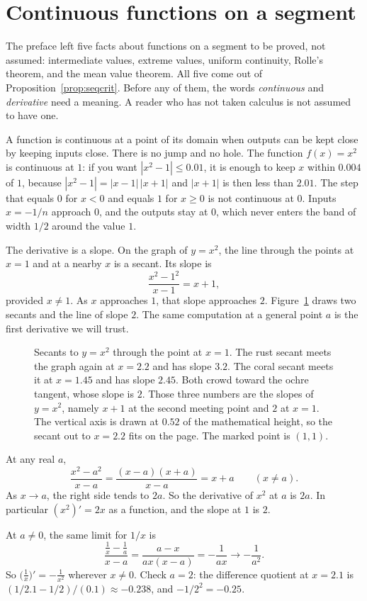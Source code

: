 \section{Continuous functions on a segment}

The preface left five facts about functions on a segment to be proved, not assumed: intermediate values, extreme values, uniform continuity, Rolle's theorem, and the mean value theorem. All five come out of Proposition~\ref{prop:seqcrit}. Before any of them, the words \emph{continuous} and \emph{derivative} need a meaning. A reader who has not taken calculus is not assumed to have one.

A function is continuous at a point of its domain when outputs can be kept close by keeping inputs close. There is no jump and no hole. The function $f(x)=x^2$ is continuous at $1$: if you want $|x^2-1|\le 0.01$, it is enough to keep $x$ within $0.004$ of $1$, because $|x^2-1|=|x-1|\,|x+1|$ and $|x+1|$ is then less than $2.01$. The step that equals $0$ for $x<0$ and equals $1$ for $x\ge 0$ is not continuous at $0$. Inputs $x=-1/n$ approach $0$, and the outputs stay at $0$, which never enters the band of width $1/2$ around the value $1$.

The derivative is a slope. On the graph of $y=x^2$, the line through the points at $x=1$ and at a nearby $x$ is a secant. Its slope is
\[
\frac{x^2-1^2}{x-1}=x+1,
\]
provided $x\ne 1$. As $x$ approaches $1$, that slope approaches $2$. Figure~\ref{fig:secant} draws two secants and the line of slope $2$. The same computation at a general point $a$ is the first derivative we will trust.

\begin{figure}[ht]
\centering
{}
\caption{Secants to $y=x^2$ through the point at $x=1$. The rust secant meets the graph again at $x=2.2$ and has slope $3.2$. The coral secant meets it at $x=1.45$ and has slope $2.45$. Both crowd toward the ochre tangent, whose slope is $2$. Those three numbers are the slopes of $y=x^2$, namely $x+1$ at the second meeting point and $2$ at $x=1$. The vertical axis is drawn at $0.52$ of the mathematical height, so the secant out to $x=2.2$ fits on the page. The marked point is $(1,1)$.}
\label{fig:secant}
\end{figure}

\begin{examplex}
At any real $a$,
\[
\frac{x^2-a^2}{x-a}=\frac{(x-a)(x+a)}{x-a}=x+a\qquad(x\ne a).
\]
As $x\to a$, the right side tends to $2a$. So the derivative of $x^2$ at $a$ is $2a$. In particular $(x^2)'=2x$ as a function, and the slope at $1$ is $2$.

At $a\ne 0$, the same limit for $1/x$ is
\[
\frac{\frac1x-\frac1a}{x-a}=\frac{a-x}{ax(x-a)}=-\frac1{ax}\longrightarrow-\frac1{a^2}.
\]
So $\bigl(\frac1x\bigr)'=-\frac1{x^2}$ wherever $x\ne 0$. Check $a=2$: the difference quotient at $x=2.1$ is $(1/2.1-1/2)/(0.1)\approx -0.238$, and $-1/2^2=-0.25$.
\end{examplex}

